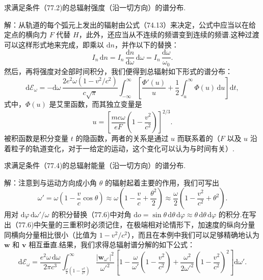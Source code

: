 \begin{xiti}

\quad 求满足条件（77.2)的总辐射强度（沿一切方向）的谱分布.

解：从轨道的每个弧元上发出的辐射由公式（74.13）来决定，公式中应当以在给定点的横向力 $F$ 代替 $H$，此外，还应当从不连续的频谱变到连续的频谱.这种过渡可以这样形式地来完成，即乘以 $\mathrm{d}n$，并作以下的替换：
\begin{equation*}
  I_n\,\mathrm{d}n=I_n\,\frac{\mathrm{d}n}{\mathrm{d}\omega}\,\mathrm{d}\omega
  =I_n\,\frac{\mathrm{d}\omega}{\omega_0}.
\end{equation*}
然后，再将强度对全部时间积分，我们便得到总辐射如下形式的谱分布：
\begin{equation*}
  \mathrm{d}\mathcal{E}_{\omega}=-\mathrm{d}\omega\,
  \frac{2e^2\omega(1-v^2/c^2)}{c\sqrt{\pi}}
  \int_{-\infty}^{\infty}\left[\frac{\Phi'(u)}{u}
  +\frac{1}{2}\int_u^{\infty}\Phi(u)\,\mathrm{d}u\right]\mathrm{d}t,
\end{equation*}
式中，$\Phi(u)$ 是艾里函数，而其独立变量是
\begin{equation*}
  u=\left[\frac{mc\omega}{eF}\left(1-\frac{v^2}{c^2}\right)\right]^{2/3}.
\end{equation*}
被积函数是积分变量 $t$ 的隐函数，两者的关系是通过 $u$ 而联系着的（$F$ 以及 $u$ 沿着粒子的轨道变化，对于一给定的运动，这个变化可以认为与时间有关）.

\quad 求满足条件（77.4)的总辐射能量（沿一切方向）的谱分布.

解：注意到与运动方向成小角 $\theta$ 的辐射起着主要的作用，我们可写出
\begin{equation*}
  \omega'=\omega\left(1-\frac{v}{c}\cos\theta\right)
  \approx\omega\left(1-\frac{v}{c}+\frac{\theta^2}{2}\right)
  \approx\frac{\omega}{2}\left(1-\frac{v^2}{c^2}+\theta^2\right).
\end{equation*}
用对 $\mathrm{d}\varphi\,\mathrm{d}\omega'/\omega$ 的积分替换（77.6)中对角
$\mathrm{d}o=\sin\theta\,\mathrm{d}\theta\,\mathrm{d}\varphi\approx\theta\,\mathrm{d}\theta\,\mathrm{d}\varphi$ 的积分.在写出（77.6)中矢量的三重积时必须记住，在极端相对论情形下，加速度的纵向分量同横向分量相比很小（比值为 $1-v^2/c^2$），而且在本例中我们可以足够精确地认为 $\boldsymbol{w}$ 和 $\boldsymbol{v}$ 相互垂直.结果，我们求得总辐射谱分解的如下公式：
\begin{equation*}
  \mathrm{d}\mathcal{E}_{\omega}=\frac{e^2\omega\,\mathrm{d}\omega}{2\pi c^3}
  \int_{\frac{\omega}{2}\left(1-\frac{v^2}{c^2}\right)}^{\infty}
  \frac{|\boldsymbol{w}_{\omega'}|^2}{\omega'^2}
  \left[1-\frac{\omega}{\omega'}\left(1-\frac{v^2}{c^2}\right)
  +\frac{\omega^2}{2\omega'^2}\left(1-\frac{v^2}{c^2}\right)^{\!2}\right]\mathrm{d}\omega'.
\end{equation*}

\end{xiti}

